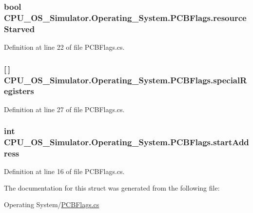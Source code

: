 \subsubsection[{resource\+Starved}]{\setlength{\rightskip}{0pt plus 5cm}bool C\+P\+U\+\_\+\+O\+S\+\_\+\+Simulator.\+Operating\+\_\+\+System.\+P\+C\+B\+Flags.\+resource\+Starved}\label{struct_c_p_u___o_s___simulator_1_1_operating___system_1_1_p_c_b_flags_ad9a23e852aa137ab0289efebb5645b19}


Definition at line 22 of file P\+C\+B\+Flags.\+cs.

\hypertarget{struct_c_p_u___o_s___simulator_1_1_operating___system_1_1_p_c_b_flags_aa313adebffa50118e5fbaa09122b32fd}{}
\subsubsection[{special\+Registers}]{ \mbox{[}$\,$\mbox{]} C\+P\+U\+\_\+\+O\+S\+\_\+\+Simulator.\+Operating\+\_\+\+System.\+P\+C\+B\+Flags.\+special\+Registers}\label{struct_c_p_u___o_s___simulator_1_1_operating___system_1_1_p_c_b_flags_aa313adebffa50118e5fbaa09122b32fd}


Definition at line 27 of file P\+C\+B\+Flags.\+cs.

\hypertarget{struct_c_p_u___o_s___simulator_1_1_operating___system_1_1_p_c_b_flags_a774bd0d595863252698e5dfc36015c50}{}
\subsubsection[{start\+Address}]{\setlength{\rightskip}{0pt plus 5cm}int C\+P\+U\+\_\+\+O\+S\+\_\+\+Simulator.\+Operating\+\_\+\+System.\+P\+C\+B\+Flags.\+start\+Address}\label{struct_c_p_u___o_s___simulator_1_1_operating___system_1_1_p_c_b_flags_a774bd0d595863252698e5dfc36015c50}


Definition at line 16 of file P\+C\+B\+Flags.\+cs.



The documentation for this struct was generated from the following file\+:\begin{DoxyCompactItemize}
\item 
Operating System/\hyperlink{_p_c_b_flags_8cs}{P\+C\+B\+Flags.\+cs}\end{DoxyCompactItemize}
